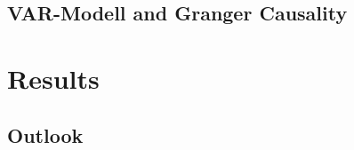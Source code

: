 \documentclass[11pt]{article}
\begin{document}
\subsection{VAR-Modell and Granger Causality}


\section{Results}
\subsection{Outlook}






\medskip

 
\end{document}
